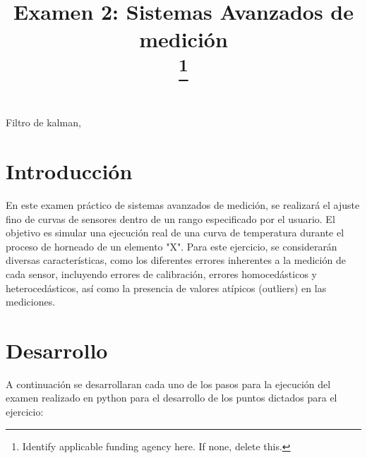 \documentclass[conference]{IEEEtran}
\begin{document}
\title{Examen 2: Sistemas Avanzados de medici\'on\\
\thanks{Identify applicable funding agency here. If none, delete this.}
}

\author{
\and
{}

}

\maketitle

\begin{IEEEkeywords}
Filtro de kalman, 
\end{IEEEkeywords}

\section{Introducción}

En este examen práctico de sistemas avanzados de medición, se realizará el ajuste fino de curvas de sensores dentro de un rango especificado por el usuario. El objetivo es simular una ejecución real de una curva de temperatura durante el proceso de horneado de un elemento "X". Para este ejercicio, se considerarán diversas características, como los diferentes errores inherentes a la medición de cada sensor, incluyendo errores de calibración, errores homocedásticos y heterocedásticos, así como la presencia de valores atípicos (outliers) en las mediciones.



\section{Desarrollo}

A continuación se desarrollaran cada uno de los pasos para la ejecución del examen realizado en python para el desarrollo de los puntos dictados para el ejercicio:\\
\end{document}
